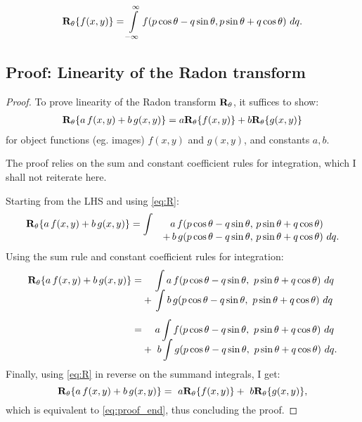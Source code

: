 \begin{alignat}{2}
  \mathbf{R}_\theta\{f(x, y)\} =\int\limits_{-\infty}^\infty f(p \cos \theta - q \sin \theta, p \sin \theta + q
  \cos \theta) \ dq. \label{eq:R}
\end{alignat}


\subsection{Proof: Linearity of the Radon transform}
\begin{proof}
To prove linearity of the Radon transform $\mathbf{R}_\theta$, it suffices to show:
\begin{align}
  \mathbf{R}_\theta\{a\,f(x, y) + b\,g(x, y)\} = a \mathbf{R}_\theta\{f(x, y)\} + b \mathbf{R}_\theta\{g(x, y)\}
  \label{eq:proof_end}
\end{align}
for object functions (eg. images) $f(x, y)$ and $g(x, y)$, and
constants $a, b$.

\noindent The proof relies on the sum and constant coefficient rules for integration,
  which I shall not reiterate here.

Starting from the LHS and using \cref{eq:R}:
\begin{alignat*}{3}
  \mathbf{R}_\theta\{a\,f(x, y) + b\,g(x, y)\} &=
    \int &a\,f(p \cos \theta - q \sin \theta,\ &p \sin \theta + q \cos
    \theta)\\[-8pt]
    &&+\, b\,g(p \cos \theta - q \sin \theta,\ &p \sin \theta + q \cos \theta)\
    dq.
\end{alignat*}
\noindent Using the sum rule and constant coefficient rules for integration:
\begin{align*}
  \mathbf{R}_\theta\{a\,f(x, y) + b\,g(x, y)\} =
    &\quad \, \int a\,f(p \cos \theta - q \sin \theta,\ p \sin \theta + q \cos
    \theta)\ dq\\[-6pt]
     &+\, \int b\,g(p \cos \theta - q \sin \theta,\ p \sin \theta + q \cos \theta)\
    dq\\[4pt]
  =
    &\quad \, \,  a \int f(p \cos \theta - q \sin \theta,\ p \sin \theta + q \cos
    \theta)\ dq\\[-6pt]
     &+\ b \int g(p \cos \theta - q \sin \theta,\ p \sin \theta + q \cos \theta)\
    dq.
\end{align*}
\noindent Finally, using \cref{eq:R} in reverse on the summand integrals, I get:
$$
  \mathbf{R}_\theta\{a\,f(x, y) + b\,g(x, y)\} =\ a \mathbf{R}_\theta\{f(x, y)\} +\ b \mathbf{R}_\theta\{g(x, y)\},
$$
  which is equivalent to \cref{eq:proof_end}, thus concluding the proof.
\end{proof}


\sectend
